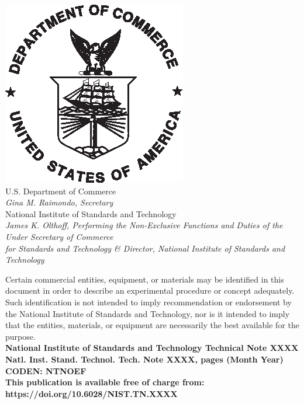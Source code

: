 \documentclass[12pt]{article}
\newcommand{\pubnumber}{XXXX}
\newcommand{\DOI}{https://doi.org/10.6028/NIST.TN.XXXX}
\newcommand{\monthyear}{Month Year}
\begin{document}
\begin{titlepage}
\begin{flushright}
\includegraphics[width=0.18\linewidth]{DoC-logo.eps}\\ 
\vfill
\footnotesize U.S. Department of Commerce\\ 
\textit{Gina M. Raimondo, Secretary}\\
\vspace{10pt}
National Institute of Standards and Technology\\ 
\hspace*{-3cm}\textit{James K. Olthoff, Performing the Non-Exclusive Functions and Duties of the Under Secretary of Commerce \\
for Standards and Technology \& Director, National Institute of Standards and Technology} 
\end{flushright}
\end{titlepage}

\begin{titlepage}
\begin{flushright}
\footnotesize  Certain commercial entities, equipment, or materials may be identified in this document in order to describe an experimental procedure or concept adequately. Such identification is not intended to imply recommendation or endorsement by the National Institute of Standards and Technology, nor is it intended to imply that the entities, materials, or equipment are necessarily the best available for the purpose.\\ 
\vfill
\normalsize \textbf{National Institute of Standards and Technology Technical Note \pubnumber\\ 
Natl. Inst. Stand. Technol. Tech. Note \pubnumber, \pageref{LastPage} pages (\monthyear)} \\
\textbf{CODEN: NTNOEF}\\
\vspace{12pt}
\textbf{This publication is available free of charge from: \DOI}
\vfill
\end{flushright}
\end{titlepage}
\end{document}
